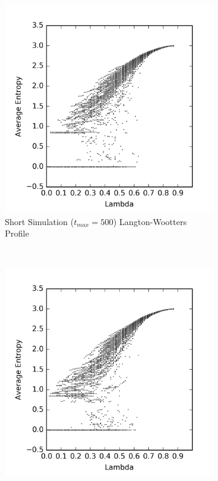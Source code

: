 \documentclass[a4paper,11pt,twoside]{report}
\begin{document}
\begin{figure}[htp]
\centering
  \begin{subfigure}[t]{0.6\textwidth}
  \includegraphics[width=\textwidth]{ch6_figs/reg_entropy_500_scatter}
  \caption{Short Simulation ($t_{max} = 500$) Langton-Wootters Profile}
  \label{fig:lw_profile_short}
  \end{subfigure}
  ~
  \begin{subfigure}[t]{0.6\textwidth}
  \centering
  \includegraphics[width=\textwidth]{ch6_figs/reg_entropy_1000_scatter}

\end{subfigure}
\end{figure}
\end{document}
